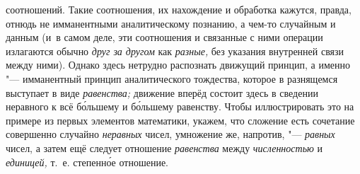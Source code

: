 соотношений. Такие соотношения, их нахождение и обработка кажутся, правда,
отнюдь не имманентными аналитическому познанию, а чем-то
случайным и данным (и~в самом деле, эти соотношения и связанные с ними
операции излагаются обычно {\em друг за другом} как {\em разные,} без
указания внутренней связи между ними). Однако здесь нетрудно распознать
движущий принцип, а именно "--- имманентный принцип
аналитического тождества, которое в разнящемся выступает в виде
{\em равенства;} движение
вперёд состоит здесь в сведении неравного к всё б\'{о}льшему и б\'{о}льшему
равенству. Чтобы иллюстрировать это на примере из первых элементов
математики, укажем, что сложение есть сочетание совершенно случайно
{\em неравных} чисел, умножение же, напротив, "--- {\em равных}
чисел, а затем ещё следует отношение {\em равенства} между {\em численностью}
и {\em единицей,} т.~е. степенн\'{о}е отношение.

